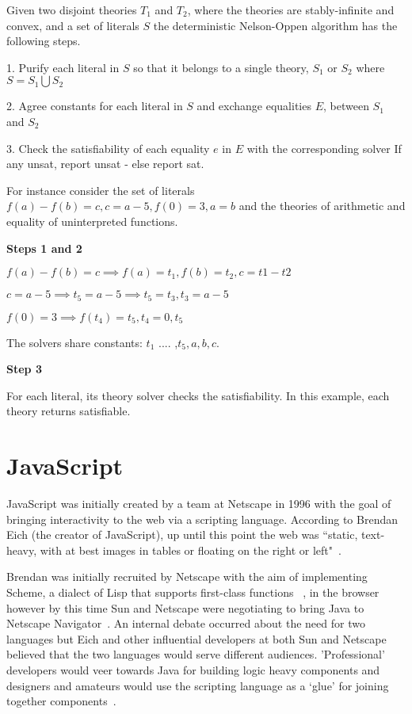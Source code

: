 \documentclass[]{final_report}
\begin{document}
Given two disjoint theories $T_1$ and $T_2$, where the theories are stably-infinite and convex, and a set of literals $S$ the deterministic Nelson-Oppen algorithm has the following steps.

1. Purify each literal in $S$ so that it belongs to a single theory, $S_1$ or $S_2$ where $S = S_1 \bigcup S_2$

2. Agree constants for each literal in $S$ and exchange equalities $E$, between $S_1$ and $S_2$

3. Check the satisfiability of each equality $e$ in $E$ with the corresponding solver If any unsat, report unsat - else report sat.

For instance consider the set of literals $f(a) - f(b) = c, c = a -5, f(0) = 3, a = b$ and the theories of arithmetic and equality of uninterpreted functions.

\textbf{Steps 1 and 2}

$f(a) - f(b) = c \implies f(a) = t_1, f(b) = t_2, c = t1 - t2$

$c = a - 5 \implies t_5 = a - 5 \implies t_5 = t_3, t_3 = a- 5$

$f(0) =3 \implies f(t_4) = t_5, t_4 = 0, t_5$

The solvers share constants: $t_1$ .... ,$t_5, a, b, c$.

\textbf{Step 3}

For each literal, its theory solver checks the satisfiability. In this example, each theory returns satisfiable.

\chapter{JavaScript}

JavaScript was initially created by a team at Netscape in 1996 with the goal of bringing interactivity to the web via a scripting language. According to Brendan Eich (the creator of JavaScript), up until this point the web was ``static, text-heavy, with at best images in tables or floating on the right or left"~\cite{AZProgrammingLanguages}. 

Brendan was initially recruited by Netscape with the aim of implementing Scheme, a dialect of Lisp that supports first-class functions ~\cite{dybvig1996scheme}, in the browser however by this time Sun and Netscape were negotiating to bring Java to Netscape Navigator~\cite{popularityofjavascript}. An internal debate occurred about the need for two languages but Eich and other influential developers at both Sun and Netscape believed that the two languages would serve different audiences. 'Professional' developers would veer towards Java for building logic heavy components and designers and amateurs would use the scripting language as a `glue' for joining together components~\cite{AZProgrammingLanguages}.
\end{document}
